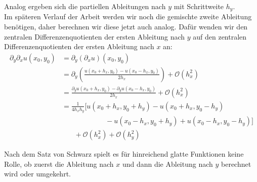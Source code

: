 Analog ergeben sich die partiellen Ableitungen nach $y$ mit Schrittweite $h_y$. \\

Im späteren Verlauf der Arbeit werden wir noch die gemischte zweite Ableitung benötigen, daher berechnen wir diese jetzt auch analog. Dafür wenden wir den zentralen Differenzenquotienten der ersten Ableitung nach $y$ auf den zentralen Differenzenquotienten der ersten Ableitung nach $x$ an:
\begin{align} 
    \partial_y \partial_x u(x_0, y_0) & = \partial_y (\partial_x u)(x_0, y_0) \nonumber \\
    & = \partial_y \left( \frac{u(x_0 + h_x, y_0) - u(x_0 - h_x, y_0)}{2h_x} \right) + \mathcal{O}(h_x^2) \nonumber \\
    & = \frac{\partial_y u(x_0 + h_x, y_0) - \partial_y u(x_0 - h_x, y_0)}{2h_x} \nonumber + \mathcal{O}(h_x^2) \\
    & = \frac{1}{4h_xh_y} \bigl[ u(x_0 + h_x, y_0 + h_y) - u(x_0 + h_x, y_0 - h_y) \nonumber \\ 
        & \phantom{mmmmmmm} - u(x_0 - h_x, y_0 + h_y) + u(x_0 - h_x, y_0 - h_y) \bigr] \nonumber \\
        & \phantom{mm} + \mathcal{O}(h_x^2) + \mathcal{O}(h_y^2) \label{eq:diff_second_mixed}
\end{align}

Nach dem Satz von Schwarz spielt es für hinreichend glatte Funktionen keine Rolle, ob zuerst die Ableitung nach $x$ und dann die Ableitung nach $y$ berechnet wird oder umgekehrt.

